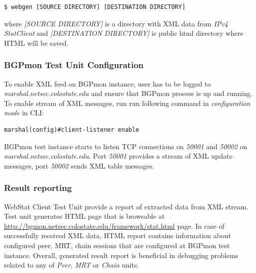 \begin{verbatim}
$ webgen [SOURCE DIRECTORY] [DESTINATION DIRECTORY]
\end{verbatim}

where \emph{[SOURCE DIRECTORY]} is a directory with XML data from \emph{IPv4 StatClient} and \emph{[DESTINATION DIRECTORY]} is public html directory where HTML will be saved. 

 


\subsubsection{BGPmon Test Unit Configuration}

To enable  XML feed on BGPmon instance, user has to be logged to \emph{marshal.netsec.colostate.edu} and ensure that BGPmon process is up and running.  To enable stream of XML messages, run   run following command in \emph{configuration mode} in  CLI:

\begin{verbatim}
marshal(config)#client-listener enable
\end{verbatim}

BGPmon test instance starts  to listen TCP connections on \emph{50001} and \emph{50002} on \emph{marshal.netsec.colostate.edu}. Port \emph{50001} provides a stream of XML update messages, port \emph{50002} sends XML table messages.



\subsubsection{Result reporting}


WebStat Client Test Unit provide a report of extracted data from XML stream. Test unit  generates HTML page that is browsable at \url{http://bgmon.netsec.colostate.edu/framework/stat.html} page. In case of successfully received XML data,  HTML report contains information about configured peer, MRT, chain sessions that are configured at BGPmon test instance.  Overall, generated result report is beneficial in debugging problems   related to any of \emph{Peer}, \emph{MRT} or \emph{Chain} units.

